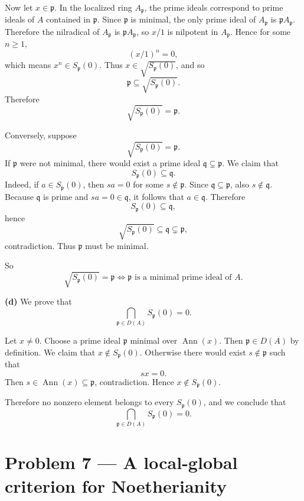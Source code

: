 \documentclass[12pt,a4paper]{article}
\theoremstyle{plain}
\theoremstyle{definition}      %
\begin{document}
	Now let \(x\in \mathfrak p\). In the localized ring \(A_{\mathfrak p}\), the prime ideals correspond to prime ideals of \(A\) contained in \(\mathfrak p\). Since \(\mathfrak p\) is minimal, the only prime ideal of \(A_{\mathfrak p}\) is \(\mathfrak p A_{\mathfrak p}\). Therefore the nilradical of \(A_{\mathfrak p}\) is \(\mathfrak p A_{\mathfrak p}\), so \(x/1\) is nilpotent in \(A_{\mathfrak p}\). Hence for some \(n\ge 1\),
	\[
	(x/1)^n=0,
	\]
	which means \(x^n\in S_{\mathfrak p}(0)\). Thus \(x\in \sqrt{S_{\mathfrak p}(0)}\), and so
	\[
	\mathfrak p\subseteq \sqrt{S_{\mathfrak p}(0)}.
	\]
	Therefore
	\[
	\sqrt{S_{\mathfrak p}(0)}=\mathfrak p.
	\]
	
	Conversely, suppose
	\[
	\sqrt{S_{\mathfrak p}(0)}=\mathfrak p.
	\]
	If \(\mathfrak p\) were not minimal, there would exist a prime ideal \(\mathfrak q\subsetneq \mathfrak p\). We claim that
	\[
	S_{\mathfrak p}(0)\subseteq \mathfrak q.
	\]
	Indeed, if \(a\in S_{\mathfrak p}(0)\), then \(sa=0\) for some \(s\notin \mathfrak p\). Since \(\mathfrak q\subseteq \mathfrak p\), also \(s\notin \mathfrak q\). Because \(\mathfrak q\) is prime and \(sa=0\in \mathfrak q\), it follows that \(a\in \mathfrak q\). Therefore
	\[
	S_{\mathfrak p}(0)\subseteq \mathfrak q,
	\]
	hence
	\[
	\sqrt{S_{\mathfrak p}(0)}\subseteq \mathfrak q\subsetneq \mathfrak p,
	\]
	contradiction. Thus \(\mathfrak p\) must be minimal.
	
	So
	\[
	\sqrt{S_{\mathfrak p}(0)}=\mathfrak p
	\iff
	\mathfrak p \text{ is a minimal prime ideal of }A.
	\]
	
	\medskip
	
	\textbf{(d)} We prove that
	\[
	\bigcap_{\mathfrak p\in D(A)} S_{\mathfrak p}(0)=0.
	\]
	
	Let \(x\neq 0\). Choose a prime ideal \(\mathfrak p\) minimal over \(\operatorname{Ann}(x)\). Then \(\mathfrak p\in D(A)\) by definition. We claim that \(x\notin S_{\mathfrak p}(0)\). Otherwise there would exist \(s\notin \mathfrak p\) such that
	\[
	sx=0.
	\]
	Then \(s\in \operatorname{Ann}(x)\subseteq \mathfrak p\), contradiction. Hence \(x\notin S_{\mathfrak p}(0)\).
	
	Therefore no nonzero element belongs to every \(S_{\mathfrak p}(0)\), and we conclude that
	\[
	\bigcap_{\mathfrak p\in D(A)} S_{\mathfrak p}(0)=0.
	\]
	
	\bigskip
	
	\section*{Problem 7 --- A local-global criterion for Noetherianity}
	
\end{document}
